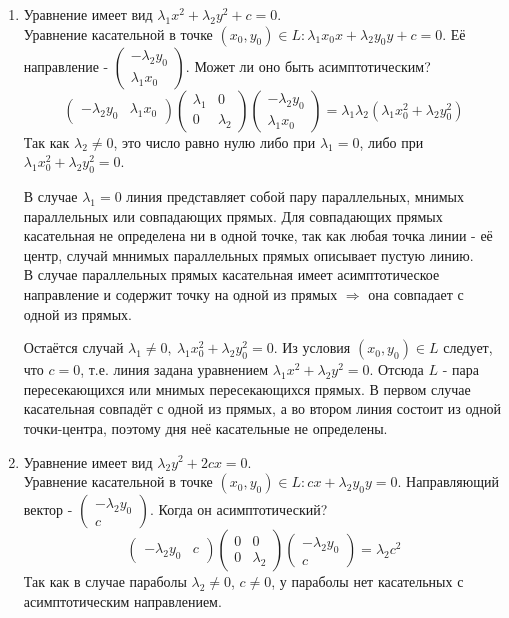 \documentclass[a4paper, 12pt]{article}
\theoremstyle{definition}
\begin{document}
	\begin{enumerate}
		\item Уравнение имеет вид $\lambda_1x^2+\lambda_2y^2+c=0$.\\
		Уравнение касательной в точке $(x_0, y_0)\in L: \lambda_1x_0x+\lambda_2y_0y+c=0$.
		Её направление -  $\begin{pmatrix} -\lambda_2y_0 \\ \lambda_1x_0 \end{pmatrix}$. Может ли оно быть асимптотическим?
		$$\begin{pmatrix} -\lambda_2y_0 & \lambda_1x_0 \end{pmatrix}\begin{pmatrix} \lambda_1&0 \\ 0&\lambda_2 \end{pmatrix}\begin{pmatrix} -\lambda_2y_0 \\ \lambda_1x_0 \end{pmatrix} = \lambda_1\lambda_2(\lambda_1x_0^2 + \lambda_2y_0^2)$$
		Так как $\lambda_2 \neq 0$, это число равно нулю либо при $\lambda_1 = 0$, либо при $\lambda_1x_0^2 + \lambda_2y_0^2 = 0$.
		
		В случае $\lambda_1 = 0$ линия представляет собой пару параллельных, мнимых параллельных или совпадающих прямых. Для совпадающих прямых касательная не определена ни в одной точке, так как любая точка линии - её центр, случай мннимых параллельных прямых описывает пустую линию.\\
		В случае параллельных прямых касательная имеет асимптотическое направление и содержит точку на одной из прямых $\Rightarrow$ она совпадает с одной из прямых.

		Остаётся случай $\lambda_1 \neq 0, \ \lambda_1x_0^2 + \lambda_2y_0^2 = 0$. Из условия $(x_0, y_0) \in L$ следует, что $c = 0$, т.е. линия задана уравнением $\lambda_1x^2+\lambda_2y^2 = 0$. Отсюда $L$ -  пара пересекающихся или мнимых пересекающихся прямых. В первом случае касательная совпадёт с одной из прямых, а во втором линия состоит из одной точки-центра, поэтому дня неё касательные не определены.
		\item Уравнение имеет вид $\lambda_2y^2+2cx=0$.\\
		Уравнение касательной в точке $(x_0, y_0) \in L: cx + \lambda_2y_0y = 0$. Направляющий вектор - $\begin{pmatrix} -\lambda_2y_0 \\ c \end{pmatrix}$. Когда он асимптотический?
		$$\begin{pmatrix} -\lambda_2y_0 & c \end{pmatrix}\begin{pmatrix}0&0\\0&\lambda_2\end{pmatrix}\begin{pmatrix} -\lambda_2y_0 \\ c \end{pmatrix} = \lambda_2c^2$$
		Так как в случае параболы $\lambda_2 \neq 0$, $c \neq 0$, у параболы нет касательных с асимптотическим направлением.
	\end{enumerate}
\end{document}
